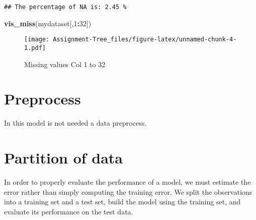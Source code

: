 \documentclass[
]{article}
\newenvironment{Shaded}{\begin{snugshade}}{\end{snugshade}}
\newcommand{\DataTypeTok}[1]{\textcolor[rgb]{0.13,0.29,0.53}{#1}}
\newcommand{\DecValTok}[1]{\textcolor[rgb]{0.00,0.00,0.81}{#1}}
\newcommand{\KeywordTok}[1]{\textcolor[rgb]{0.13,0.29,0.53}{\textbf{#1}}}
\newcommand{\NormalTok}[1]{#1}
\newcommand{\OperatorTok}[1]{\textcolor[rgb]{0.81,0.36,0.00}{\textbf{#1}}}
\newcommand{\OtherTok}[1]{\textcolor[rgb]{0.56,0.35,0.01}{#1}}
\newcommand{\StringTok}[1]{\textcolor[rgb]{0.31,0.60,0.02}{#1}}
\begin{document}
\begin{verbatim}
## The percentage of NA is: 2.45 %
\end{verbatim}

\begin{Shaded}
\begin{Highlighting}[]
\KeywordTok{vis_miss}\NormalTok{(mydataset[,}\DecValTok{1}\OperatorTok{:}\DecValTok{32}\NormalTok{])}
\end{Highlighting}
\end{Shaded}

\begin{figure}
\centering
\texttt{[image: Assignment-Tree\_files/figure-latex/unnamed-chunk-4-1.pdf]}
\caption{Missing values Col 1 to 32}
\end{figure}

\hypertarget{preprocess}{%
\section{Preprocess}\label{preprocess}}

In this model is not needed a data preprocess.

\hypertarget{partition-of-data}{%
\section{Partition of data}\label{partition-of-data}}

In order to properly evaluate the performance of a model, we must
estimate the error rather than simply computing the training error. We
split the observations into a training set and a test set, build the
model using the training set, and evaluate its performance on the test
data.

\begin{Shaded}
\end{Shaded}
\end{document}
